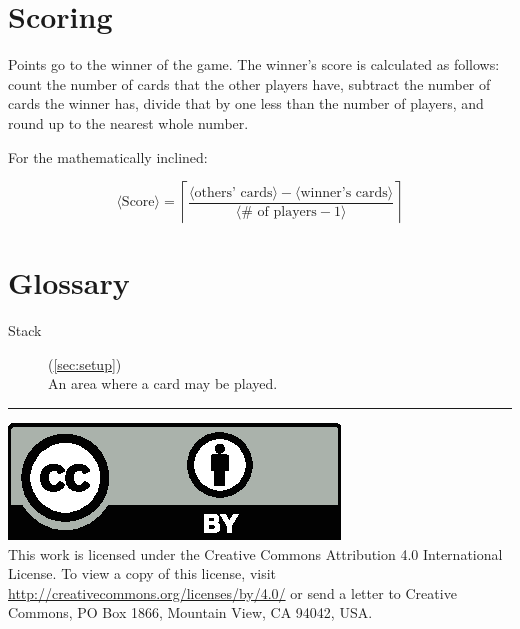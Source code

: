 \documentclass{article}
\begin{document}
\section{Scoring}

Points go to the winner of the game. The winner's score is calculated as follows: count the number of cards that the other players have, subtract the number of cards the winner has, divide that by one less than the number of players, and round up to the nearest whole number.

For the mathematically inclined:

$$
\langle\textrm{Score}\rangle = \left\lceil\frac{\langle\textrm{others'\ cards}\rangle - \langle\textrm{winner's\ cards}\rangle}{\langle\textrm{\#\ of\ players} - 1\rangle}\right\rceil
$$

\section{Glossary}
\begin{description}
  \item[Stack] (\autoref{sec:setup})\\
    An area where a card may be played.
\end{description}

\medskip
\hrule

{
  \small
  \includegraphics[scale=0.5]{cc-by.eps}\\
  This work is licensed under the Creative Commons Attribution 4.0
  International License. To view a copy of this license, visit
  \url{http://creativecommons.org/licenses/by/4.0/} or send a letter to Creative Commons, PO Box 1866, Mountain View, CA 94042, USA.
}
\end{document}
